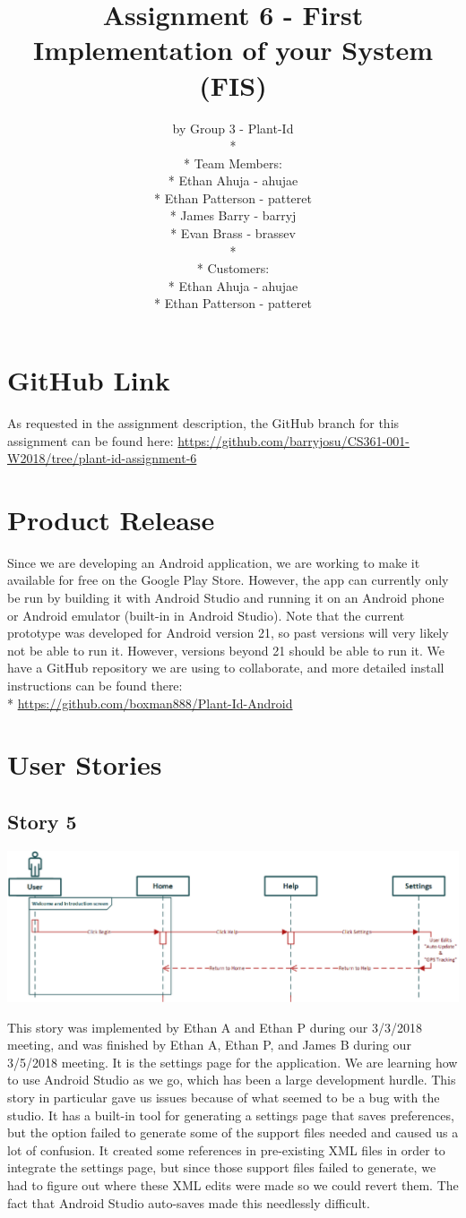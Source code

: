 \documentclass[a4paper]{article}
\title{Assignment 6 - First Implementation of your System (FIS)}
\author{ by Group 3 - Plant-Id \\* \\* Team Members: \\* Ethan Ahuja - ahujae \\* Ethan Patterson - patteret \\* James Barry - barryj \\* Evan Brass - brassev \\* \\* Customers: \\* Ethan Ahuja - ahujae \\* Ethan Patterson - patteret}
\begin{document}
\maketitle
\pagebreak
\tableofcontents
\pagebreak
\section{GitHub Link}
As requested in the assignment description, the GitHub branch for this assignment can be found here: \url{https://github.com/barryjosu/CS361-001-W2018/tree/plant-id-assignment-6}

\section{Product Release}
Since we are developing an Android application, we are working to make it available for free on the Google Play Store. However, the app can currently only be run by building it with Android Studio and running it on an Android phone or Android emulator (built-in in Android Studio). Note that the current prototype was developed for Android version 21, so past versions will very likely not be able to run it. However, versions beyond 21 should be able to run it. We have a GitHub repository we are using to collaborate, and more detailed install instructions can be found there: \\*
\url{https://github.com/boxman888/Plant-Id-Android}
\pagebreak
\section{User Stories}
\subsection{Story 5}
\begin{center}\includegraphics[scale=.66]{Story5.eps}\end{center}
This story was implemented by Ethan A and Ethan P during our 3/3/2018 meeting, and was finished by Ethan A, Ethan P, and James B during our 3/5/2018 meeting. It is the settings page for the application. We are learning how to use Android Studio as we go, which has been a large development hurdle. This story in particular gave us issues because of what seemed to be a bug with the studio. It has a built-in tool for generating a settings page that saves preferences, but the option failed to generate some of the support files needed and caused us a lot of confusion. It created some references in pre-existing XML files in order to integrate the settings page, but since those support files failed to generate, we had to figure out where these XML edits were made so we could revert them. The fact that Android Studio auto-saves made this needlessly difficult. 
\end{document}
